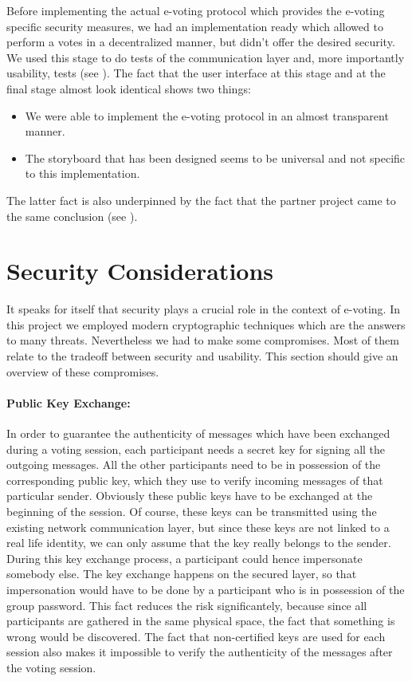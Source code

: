 \documentclass[numbers=noenddot, abstract=on, a4paper, headsepline,
footsepline, oneside, draft=off]{scrreprt}
\newcommand{\myref}[1]{(see \Vref{#1})}
\begin{document}
Before implementing the actual e-voting protocol which provides the e-voting
specific security measures, we had an implementation ready which allowed to
perform a votes in a decentralized manner, but didn't offer the desired
security. We used this stage to do tests of the communication layer and, more
importantly usability, tests \myref{sec:usabilitytests}. The fact that the user
interface at this stage and at the final stage almost look identical shows two
things:
\begin{itemize}
  \item We were able to implement the e-voting protocol in an almost transparent
  manner. 
  \item The storyboard that has been designed seems to be universal and not
  specific to this implementation.
\end{itemize}
The latter fact is also underpinned by the fact that the partner project came to
the same conclusion \myref{sec:comparisontopartnerproject}.

\section{Security Considerations}
It speaks for itself that security plays a crucial role in the context of
e-voting. In this project we employed modern cryptographic techniques which are
the answers to many threats. Nevertheless we had to make some compromises. Most
of them relate to the tradeoff between security and usability. This section
should give an overview of these compromises.

\paragraph{Public Key Exchange:} In order to guarantee the authenticity of
messages which have been exchanged during a voting session, each participant
needs a secret key for signing all the outgoing messages. All the other
participants need to be in possession of the corresponding public key, which
they use to verify incoming messages of that particular sender. Obviously these
public keys have to be exchanged at the beginning of the session. Of course,
these keys can be transmitted using the existing network communication layer,
but since these keys are not linked to a real life identity, we can only assume
that the key really belongs to the sender. During this key exchange process, a
participant could hence impersonate somebody else. The key exchange happens on
the secured layer, so that impersonation would have to be done by a participant
who is in possession of the group password. This fact reduces the risk
significantely, because since all participants are gathered in the same physical
space, the fact that something is wrong would be discovered. The fact that
non-certified keys are used for each session also makes it impossible to verify
the authenticity of the messages after the voting session.
\end{document}
